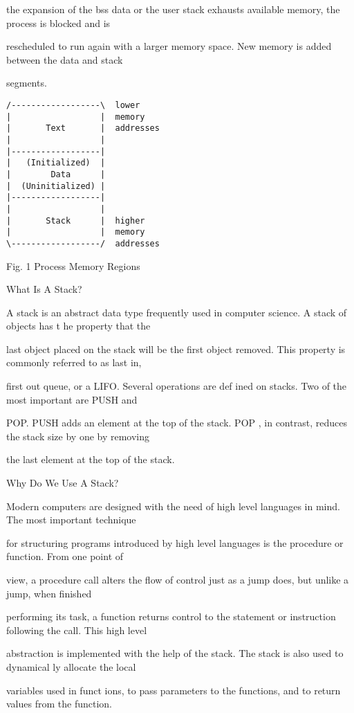 \documentclass[10pt]{article}
\begin{document}
the expansion of the bss data or the user stack exhausts available memory, the process is blocked and is 

rescheduled to run again with a larger memory space. New memory is added between the data and stack 

segments.

\begin{lstlisting}[caption=Process Memory Regions]
/------------------\  lower
|                  |  memory
|       Text       |  addresses
|                  |
|------------------|
|   (Initialized)  |
|        Data      |
|  (Uninitialized) |
|------------------|
|                  |
|       Stack      |  higher
|                  |  memory
\------------------/  addresses
\end{lstlisting}

Fig. 1 Process Memory Regions

What Is A Stack?

A stack is an abstract data type frequently used in computer science.  A stack of objects has t he property that the 

last object placed on the stack will be the first object removed. This property is commonly referred to as last in, 

first out queue, or a LIFO. Several operations are def ined on stacks. Two of the most important are PUSH and 

POP. PUSH adds an element at the top of the stack. POP , in contrast, reduces the stack size by one by removing 

the last element at the top of the stack.

Why Do We Use A Stack?

Modern computers are designed with the need of high level languages in mind. The most important technique 

for structuring programs introduced by high level languages is the procedure or function. From one point of 

view, a procedure call alters the flow of control just as a jump does, but unlike a jump, when finished 

performing its task, a function returns control to the statement or instruction following the call. This high level 

abstraction is implemented with the help of the stack. The stack is also used to dynamical ly allocate the local 

variables used in funct ions, to pass parameters to the functions, and to return values from the function.
\end{document}
